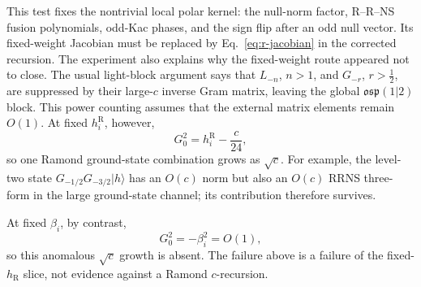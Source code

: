 \documentclass[11pt]{article}
\newcommand{\R}{\mathrm{R}}
\newcommand{\osp}{\mathfrak{osp}(1|2)}
\begin{document}
This test fixes the nontrivial local polar kernel: the null-norm factor,
R--R--NS fusion polynomials, odd-Kac phases, and the sign flip after an odd
null vector.  Its fixed-weight Jacobian must be replaced by
Eq.~\eqref{eq:r-jacobian} in the corrected recursion.  The experiment also
explains why the fixed-weight route appeared not to close.  The usual
light-block argument says that
$L_{-n}$, $n>1$, and $G_{-r}$, $r>\frac12$, are suppressed by their
large-$c$ inverse Gram matrix, leaving the global $\osp$ block.  This power
counting assumes that the external matrix elements remain $O(1)$.  At fixed
$h_i^{\R}$, however,
\begin{equation}
 G_0^2=h_i^{\R}-\frac{c}{24},
 \label{eq:ramond-g0-large-c}
\end{equation}
so one Ramond ground-state combination grows as $\sqrt c$.  For example,
the level-two state $G_{-1/2}G_{-3/2}|h\rangle$ has an $O(c)$ norm but also
an $O(c)$ RRNS three-form in the large ground-state channel; its contribution
therefore survives.

At fixed \(\beta_i\), by contrast,
\begin{equation}
 G_0^2=-\beta_i^2=O(1),
\end{equation}
so this anomalous \(\sqrt c\) growth is absent.  The failure above is a
failure of the fixed-\(h_{\R}\) slice, not evidence against a Ramond
\(c\)-recursion.
\end{document}
